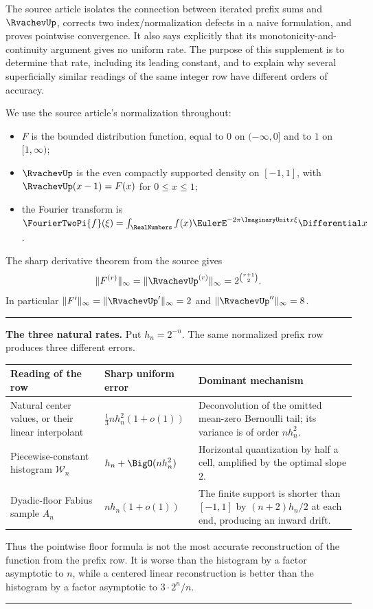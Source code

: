 \documentclass[11pt,oneside]{article}
\theoremstyle{definition}
\theoremstyle{remark}
\newenvironment{boxedremark}{%
  \par\smallskip\noindent\begin{center}\begin{minipage}{0.94\textwidth}%
  \color{black}\hrule\vspace{0.6em}\small
}{%
  \vspace{0.6em}\hrule\end{minipage}\end{center}\smallskip
}
\begin{document}
The source article \cite{tmrates:reshetnikovExposition} isolates the connection between iterated
prefix sums and $\RvachevUp$, corrects two index/normalization defects in a naive formulation, and
proves pointwise convergence.  It also says explicitly that its monotonicity-and-continuity
argument gives no uniform rate.  The purpose of this supplement is to determine that rate,
including its leading constant, and to explain why several superficially similar readings of
the same integer row have different orders of accuracy.

We use the source article's normalization throughout:
\begin{itemize}
\item $F$ is the bounded distribution function, equal to $0$ on $(-\infty,0]$ and to $1$ on
      $[1,\infty)$;
\item $\RvachevUp$ is the even compactly supported density on $[-1,1]$, with
      $\RvachevUp(x-1)=F(x)$ for $0\le x\le1$;
\item the Fourier transform is
      $\FourierTwoPi{f}(\xi)=\int_{\RealNumbers}
      f(x)\EulerE^{-2\pi\ImaginaryUnit x\xi}\Differential x$.
\end{itemize}
The sharp derivative theorem from the source gives
\begin{equation}
 \|F^{(r)}\|_\infty=\|\RvachevUp^{(r)}\|_\infty
 =2^{\binom{r+1}{2}}.                                      \label{tmrates:eq:sharp-derivatives}
\end{equation}
In particular $\|F'\|_\infty=\|\RvachevUp'\|_\infty=2$ and
$\|\RvachevUp''\|_\infty=8$.

\begin{boxedremark}
\textbf{The three natural rates.}
Put $h_n=2^{-n}$.  The same normalized prefix row produces three different errors.
\begin{center}
\begin{tabularx}{0.95\textwidth}{@{}>{\raggedright\arraybackslash}p{}
>{\raggedright\arraybackslash}p{}X@{}}
\toprule
Reading of the row & Sharp uniform error & Dominant mechanism\\
\midrule
Natural center values, or their linear interpolant
& $\displaystyle \frac13 n h_n^2(1+o(1))$
& Deconvolution of the omitted mean-zero Bernoulli tail; its variance is of order $nh_n^2$.\\[0.35em]
Piecewise-constant histogram $\mathcal W_n$
& $\displaystyle h_n+\BigO(nh_n^2)$
& Horizontal quantization by half a cell, amplified by the optimal slope $2$.\\[0.35em]
Dyadic-floor Fabius sample $A_n$
& $\displaystyle n h_n(1+o(1))$
& The finite support is shorter than $[-1,1]$ by $(n+2)h_n/2$ at each end, producing an inward drift.\\
\bottomrule
\end{tabularx}
\end{center}
Thus the pointwise floor formula is not the most accurate reconstruction of the function from
the prefix row.  It is worse than the histogram by a factor asymptotic to $n$, while a
centered linear reconstruction is better than the histogram by a factor asymptotic to
$3\cdot2^n/n$.
\end{boxedremark}
\end{document}
